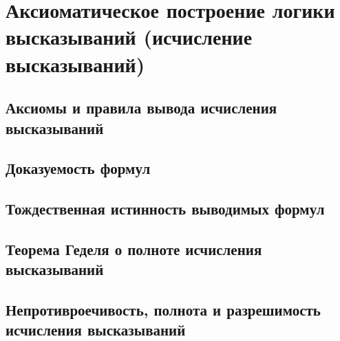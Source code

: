 \section{Аксиоматическое построение логики высказываний (исчисление высказываний)}
\subsection{Аксиомы и правила вывода исчисления высказываний}
\subsection{Доказуемость формул}
\subsection{Тождественная истинность выводимых формул}
\subsection{Теорема Геделя о полноте исчисления высказываний}
\subsection{Непротивроечивость, полнота и разрешимость исчисления высказываний}
